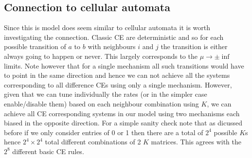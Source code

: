 \documentclass[11pt]{article}
\begin{document}
\subsection{Connection to cellular automata}
Since this is model does seem similar to cellular automata it is worth investigating the connection.
Classic CE are deterministic and so for each possible transition of $a$ to $b$ with neighbours $i$ and $j$ the transition is either always going to happen or never.
This largely corresponds to the $\mu \rightarrow \pm\inf$ limits.
Note however that for a single mechanism all such transitions would have to point in the same direction and hence we can not achieve all the systems corresponding to all difference CEs using only a single mechanism.
However, given that we can tune individually the rates (or in the simpler case enable/disable them) based on each neighbour combination using $K$, we can achieve all CE corresponding systems in our model using two mechanisms each biased in the opposite direction.
For a simple sanity check note that as dicussed before if we only consider entries of 0 or 1 then there are a total of $2^4$ possible $K$s hence $2^4\times2^4$ total different combinations of 2 $K$ matrices.
This agrees with the $2^8$ different basic CE rules.
\end{document}
